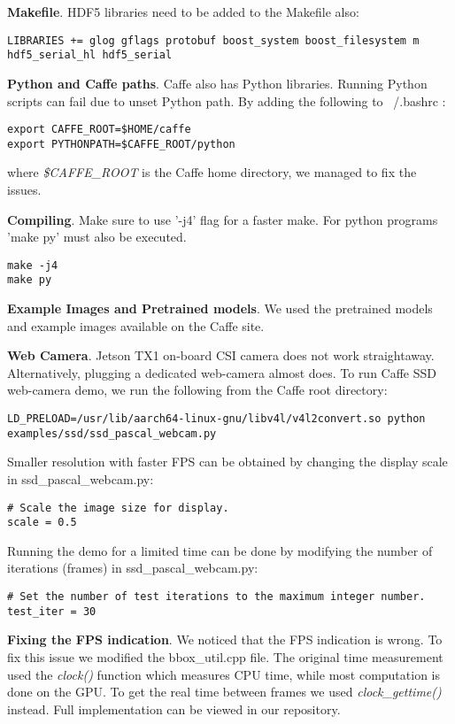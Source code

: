 \textbf{Makefile}.
HDF5 libraries need to be added to the Makefile also:
\begin{lstlisting} 
LIBRARIES += glog gflags protobuf boost_system boost_filesystem m hdf5_serial_hl hdf5_serial
\end{lstlisting}

\textbf{Python and Caffe paths}.
Caffe also has Python libraries. Running Python scripts can fail due to unset Python path. By adding the following to ~/.bashrc :
\begin{lstlisting} 
export CAFFE_ROOT=$HOME/caffe
export PYTHONPATH=$CAFFE_ROOT/python
\end{lstlisting}
where \textit{\$CAFFE\_ROOT} is the Caffe home directory, we managed to fix the issues. 

\textbf{Compiling}.
Make sure to use '-j4' flag for a faster make. For python programs 'make py' must also be executed.
\begin{lstlisting} 
make -j4
make py
\end{lstlisting}

\textbf{Example Images and Pretrained models}.
We used the pretrained models and example images available on the Caffe site.

\textbf{Web Camera}.
Jetson TX1 on-board CSI camera does not work straightaway. Alternatively, plugging a dedicated web-camera almost does. To run Caffe SSD web-camera demo, we run the following from the Caffe root directory:
\begin{lstlisting} 
LD_PRELOAD=/usr/lib/aarch64-linux-gnu/libv4l/v4l2convert.so python examples/ssd/ssd_pascal_webcam.py
\end{lstlisting}

Smaller resolution with faster FPS can be obtained by changing the display scale 
in ssd\_pascal\_webcam.py:
\begin{lstlisting} 
# Scale the image size for display.
scale = 0.5
\end{lstlisting}

Running the demo for a limited time can be done by modifying the number of iterations (frames) in ssd\_pascal\_webcam.py:
\begin{lstlisting} 
# Set the number of test iterations to the maximum integer number.
test_iter = 30 
\end{lstlisting}

\textbf{Fixing the FPS indication}. We noticed that the FPS indication is wrong. To fix this issue we modified the bbox\_util.cpp file. The original time measurement used the \textit{clock()} function which measures CPU time, while most computation is done on the GPU. To get the real time between frames we used \textit{clock\_gettime()} instead. Full implementation can be viewed in our repository.

